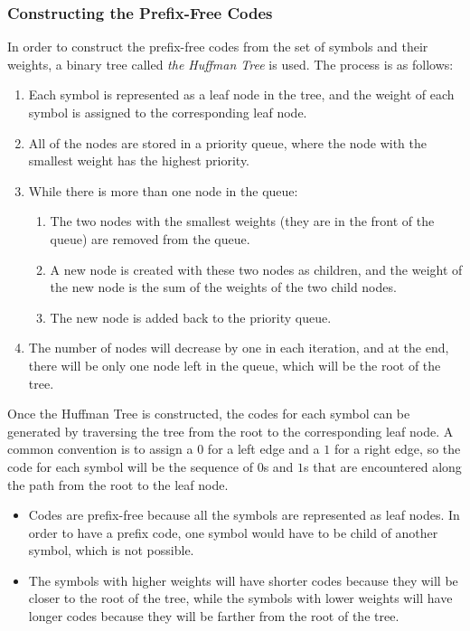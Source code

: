 \subsubsection{Constructing the Prefix-Free Codes}

In order to construct the prefix-free codes from the set of symbols and their weights, a binary tree called \emph{the Huffman Tree} is used. The process is as follows:
\begin{enumerate}
    \item Each symbol is represented as a leaf node in the tree, and the weight of each symbol is assigned to the corresponding leaf node.
    \item All of the nodes are stored in a priority queue, where the node with the smallest weight has the highest priority.
    \item While there is more than one node in the queue:
    \begin{enumerate}
        \item The two nodes with the smallest weights (they are in the front of the queue) are removed from the queue.
        \item A new node is created with these two nodes as children, and the weight of the new node is the sum of the weights of the two child nodes.
        \item The new node is added back to the priority queue.
    \end{enumerate}
    \item The number of nodes will decrease by one in each iteration, and at the end, there will be only one node left in the queue, which will be the root of the tree.
\end{enumerate}

Once the Huffman Tree is constructed, the codes for each symbol can be generated by traversing the tree from the root to the corresponding leaf node. A common convention is to assign a $0$ for a left edge and a $1$ for a right edge, so the code for each symbol will be the sequence of $0$s and $1$s that are encountered along the path from the root to the leaf node.
\begin{itemize}
    \item Codes are prefix-free because all the symbols are represented as leaf nodes. In order to have a prefix code, one symbol would have to be child of another symbol, which is not possible.
    \item The symbols with higher weights will have shorter codes because they will be closer to the root of the tree, while the symbols with lower weights will have longer codes because they will be farther from the root of the tree.
\end{itemize}

